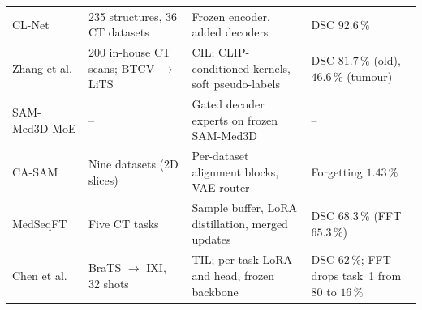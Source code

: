 {\begin{longtable}{@{}L{3.0cm}L{3.4cm}L{5.4cm}L{3.3cm}@{}}
\cmidrule(lr){1-4}
CL-Net\newline \cite{guo2025continuallearningdrivenmodelaccurate} & 235 structures, 36 CT datasets & Frozen encoder, added decoders & DSC $92.6\,\%$\\
\cmidrule(lr){1-4}
Zhang et al.\newline \cite{zhang2023continuallearningabdominalmultiorgan} & 200 in-house CT scans; BTCV $\rightarrow$ LiTS & CIL; CLIP-conditioned kernels, soft pseudo-labels & DSC $81.7\,\%$ (old), $46.6\,\%$ (tumour)\\
\cmidrule(lr){1-4}
SAM-Med3D-MoE\newline [Wan+24] & -- & Gated decoder experts on frozen SAM-Med3D & --\\
\cmidrule(lr){1-4}
CA-SAM\newline [Wan+26] & Nine datasets (2D slices) & Per-dataset alignment blocks, VAE router & Forgetting $1.43\,\%$\\
\cmidrule(lr){1-4}
MedSeqFT\newline [MedSeqFT] & Five CT tasks & Sample buffer, LoRA distillation, merged updates & DSC $68.3\,\%$ (FFT $65.3\,\%$)\\
\cmidrule(lr){1-4}
Chen et al.\newline [Che+26] & BraTS $\rightarrow$ IXI, 32 shots & TIL; per-task LoRA and head, frozen backbone & DSC $62\,\%$; FFT drops task~1 from $80$ to $16\,\%$\\
\end{longtable}}

